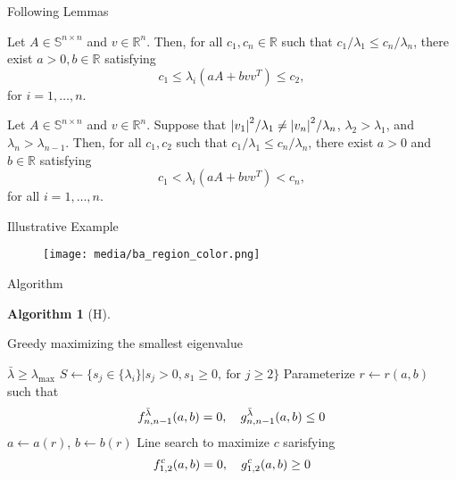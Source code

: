 \documentclass[]{beamer}
\theoremstyle{plain}
\theoremstyle{definition}
\newtheorem{algorithm}{Algorithm}
\theoremstyle{remark}
\newcommand{\MB}[1]{\mathbb{#1}}
\begin{document}
\begin{frame}{Following Lemmas}
	\begin{lemma}
		Let $A \in \MB{S}^{n \times n}$ and $v \in \MB{R}^n$. Then, for all $c_1,
		c_n \in \MB{R}$ such that $c_1/\lambda_1 \le c_n/\lambda_n$, there exist
		$a>0, b \in \MB{R}$ satisfying
		\begin{equation*}
			c_1 \le \lambda_i(a A + b v v^T) \le c_2,
		\end{equation*}
		for $i = 1, \dotsc, n$.
	\end{lemma}
	\pause

	\begin{lemma}
		Let $A \in \MB{S}^{n \times n}$ and $v \in \MB{R}^n$. Suppose that
		${\abs{v_1}^2}/{\lambda_1} \ne {\abs{v_n}^2}/{\lambda_n}$,
		$\lambda_2 > \lambda_1$, and $\lambda_n > \lambda_{n-1}$. Then, for all
		$c_1, c_2$ such that $c_1/\lambda_1 \le c_n/\lambda_n$, there exist $a > 0$
		and $b \in \MB{R}$ satisfying
		\begin{equation*}
			c_1 < \lambda_i(a A + b v v^T) < c_n,
		\end{equation*}
		for all $i = 1, \dotsc, n$.
	\end{lemma}
\end{frame}

\begin{frame}{Illustrative Example}
	\begin{figure}[h]
		\texttt{[image: media/ba\_region\_color.png]}
	\end{figure}
\end{frame}

\begin{frame}{Algorithm}
	\begin{algorithm}[H]
		\begin{algorithmic}[1]
			\caption{Greedy maximizing the smallest eigenvalue}
			\Require $\bar{\lambda} \ge \lambda_{\max}$
			\State $S \gets \{ s_j \in \{\lambda_i\} | s_j > 0, s_1 \ge 0,\ \text{for
			} j \ge 2 \}$
			\State Parameterize $r \gets r(a, b)$ such that
			\begin{equation*}
				f_{n, n-1}^{\bar{\lambda}}(a, b) = 0 \qc
				g_{n, n-1}^{\bar{\lambda}}(a, b) \le 0
			\end{equation*}
			\State $a \gets a(r)$, $b \gets b(r)$
			\State Line search to maximize $c$ sarisfying
			\begin{equation*}
				f_{1, 2}^c (a, b) = 0 \qc
				g_{1, 2}^c (a, b) \ge 0
			\end{equation*}
			\EndFor             
		\end{algorithmic}
	\end{algorithm}
\end{frame}
\end{document}
